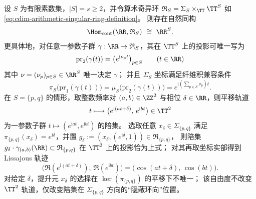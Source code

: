 \begin{theorem}[一参数子群的频率参数化与实投影读出]\label{thm:cdim-arithmetic-singular-ring-one-parameter-subgroups}
设 \(S\) 为有限素数集，\(|S|=s\ge 2\)，并令算术奇异环 \(\mathfrak{R}_S=\Sigma_S\times_{\TT}\TT^S\) 如 \eqref{eq:cdim-arithmetic-singular-ring-definition}。
则存在自然同构
\[
\Hom_{\mathrm{cont}}(\RR,\mathfrak{R}_S)\ \cong\ \RR^{S}.
\]
更具体地，对任意一参数子群 \(\gamma:\RR\to\mathfrak{R}_S\)，其在 \(\TT^S\) 上的投影可唯一写为
\begin{equation}\label{eq:cdim-arithmetic-singular-ring-exp-orbit}
\mathrm{pr}_2(\gamma(t))=\bigl(e^{\mathrm{i}\nu_p t}\bigr)_{p\in S}
\qquad(t\in\RR)
\end{equation}
其中 \(\nu=(\nu_p)_{p\in S}\in\RR^S\) 唯一决定 \(\gamma\)；
并且 \(\Sigma_S\) 坐标满足纤维积兼容条件
\[
\pi_S\bigl(\mathrm{pr}_1(\gamma(t))\bigr)
=
\mu_S\bigl(\mathrm{pr}_2(\gamma(t))\bigr)
=
e^{\mathrm{i}\left(\sum_{p\in S}\nu_p\right)t}.
\]
在 \(S=\{p,q\}\) 的情形，取整数频率对 \((a,b)\in\ZZ^2\) 与相位 \(\delta\in\RR\)，则平移轨道
\[
t\longmapsto \bigl(e^{\mathrm{i}(at+\delta)},\,e^{\mathrm{i}bt}\bigr)\in\TT^2
\]
为一参数子群 \(t\mapsto (e^{\mathrm{i}at},e^{\mathrm{i}bt})\) 的陪集。
选取任意 \(x_{\delta}\in\Sigma_{\{p,q\}}\) 满足 \(\pi_{\{p,q\}}(x_\delta)=e^{\mathrm{i}\delta}\)，并置
\(
g_{\delta}:=(x_{\delta},(e^{\mathrm{i}\delta},1))\in\mathfrak{R}_{\{p,q\}}
\)，
则陪集 \(g_{\delta}\cdot\gamma_{(a,b)}(\RR)\subset\mathfrak{R}_{\{p,q\}}\) 在 \(\TT^2\) 上的投影恰为上式；
对其再取坐标实部得到 Lissajous 轨迹
\[
\bigl(\Re(e^{\mathrm{i}(at+\delta)}),\,\Re(e^{\mathrm{i}bt})\bigr)
=\bigl(\cos(at+\delta),\,\cos(bt)\bigr).
\]
对给定 \(\delta\)，提升元 \(x_{\delta}\) 的选择在 \(\ker(\pi_{\{p,q\}})\) 的平移下不唯一；
该自由度不改变 \(\TT^2\) 轨道，仅改变陪集在 \(\Sigma_{\{p,q\}}\) 方向的“隐蔽环向”位置。
\end{theorem}

